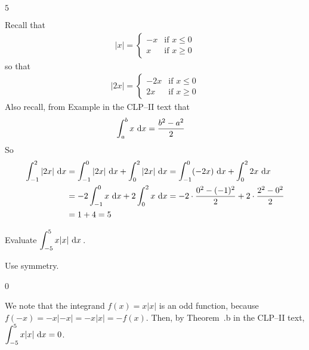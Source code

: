 \begin{answer}
$5$
\end{answer}

\begin{solution}
Recall that
\begin{align*}
|x|=\begin{cases} -x &\text{if $x\le 0$}\\
                   x &\text{if $x\ge 0$}
    \end{cases}
\end{align*}
so that
\begin{align*}
|2x|=\begin{cases} -2x &\text{if $x\le 0$}\\
                    2x &\text{if $x\ge 0$}
    \end{cases}
\end{align*}
Also recall, from  Example  in the
CLP--II text that
\begin{align*}
\int_a^b x\ \mathrm{d}x&=\frac{b^2-a^2}{2}
\end{align*}
So
\begin{align*}
\int_{-1}^2 |2x|\ \mathrm{d}x
&=\int_{-1}^0 |2x|\ \mathrm{d}x+\int_0^2 |2x|\ \mathrm{d}x
=\int_{-1}^0 (-2x)\ \mathrm{d}x+\int_0^2 2x\ \mathrm{d}x \\
&= -2\int_{-1}^0 x\ \mathrm{d}x+2\int_0^2 x\ \mathrm{d}x
=-2\cdot\frac{0^2-(-1)^2}{2} +2\cdot\frac{2^2-0^2}{2} \\
&=1+4=5
\end{align*}


\end{solution}



\begin{question}
Evaluate $\displaystyle\int_{-5}^5 x|x|\ \dee{x}$\,.
\end{question}
\begin{hint} Use symmetry.
\end{hint}
\begin{answer} 0
\end{answer}
\begin{solution}
We note that the integrand $f(x)=x|x|$ is an odd function, because $f(-x)=-x|-x|=-x|x|=-f(x)$. Then, by Theorem~.b in the CLP--II text,
 $\displaystyle\int_{-5}^5 x|x| \ \dee{x}=0$.
\end{solution}

